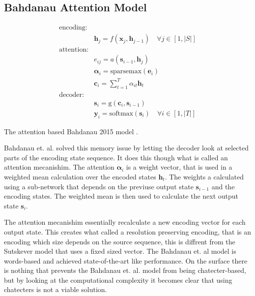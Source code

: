 \subsection{Bahdanau Attention Model}
\label{sec:theory:sequential:bahdanau}

\begin{equationbox}[H]
\begin{equation*}
\begin{aligned}
\text{encoding:} & \\
& \mathbf{h}_j = f(\mathbf{x}_j, \mathbf{h}_{j-1}) \quad \forall j \in [1, |S|] \\
\text{attention:} & \\
& e_{ij} = a(\mathbf{s}_{i-1}, \mathbf{h}_j) \\
& \bm{\alpha}_i = \mathrm{sparsemax}(\mathbf{e}_i) \\
& \mathbf{c}_i = {\textstyle \sum_{t=1}^T} \alpha_{it} \mathbf{h}_t \\
\text{decoder:} & \\
&\mathbf{s}_i = \mathrm{g}(\mathbf{c}_i, \mathbf{s}_{i-1}) \\
&\mathbf{y}_i = \mathrm{softmax}(\mathbf{s}_i) \quad \forall i \in [1, |T|] 
\end{aligned}
\end{equation*}
\caption{The attention based Bahdanau 2015 model \cite{bahdanau-2015-nmt}.}
\end{equationbox}

Bahdanau et. al. solved this memory issue by letting the decoder look at selected parts of the encoding state sequence. It does this though what is called an attention mecanishim. The attention $\bm{\alpha}_i$ is a weight vector, that is used in a weighted mean calculation over the encoded states $\mathbf{h}_t$. The weights a calculated using a sub-network that depends on the previuse output state $\mathbf{s}_{i-1}$ and the encoding states. The weighted mean is then used to calculate the next output state $\mathbf{s}_{i}$.

The attention mecanishim essentially recalculate a new encoding vector for each output state. This creates what called a resolution preserving encoding, that is an encoding which size depends on the source sequence, this is diffrent from the Sutskever model that uses a fixed sized vector. The Bahdanau et. al model is words-based and achieved state-of-the-art like performance. On the surface there is nothing that prevents the Bahdanau et. al. model from being chatecter-based, but by looking at the computational complexity it becomes clear that using chatecters is not a viable solution.

